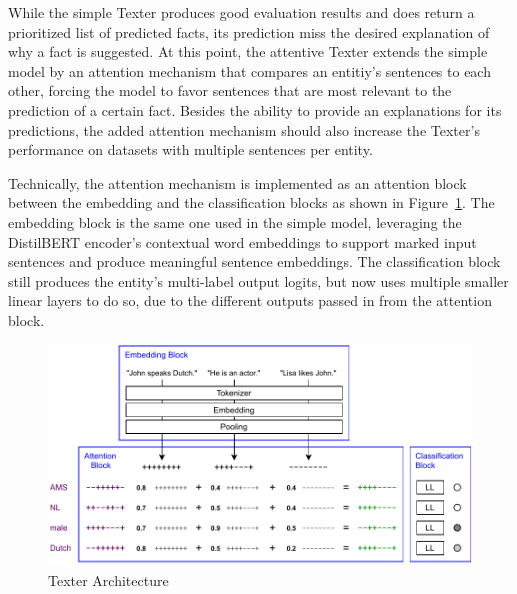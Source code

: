 While the simple Texter produces good evaluation results and does return a prioritized list of predicted facts, its prediction miss the desired explanation of why a fact is suggested. At this point, the attentive Texter extends the simple model by an attention mechanism that compares an entitiy's sentences to each other, forcing the model to favor sentences that are most relevant to the prediction of a certain fact. Besides the ability to provide an explanations for its predictions, the added attention mechanism should also increase the Texter's performance on datasets with multiple sentences per entity.

Technically, the attention mechanism is implemented as an attention block between the embedding and the classification blocks as shown in Figure~\ref{fig:4_approach/1_texter/2_attention_model/attention_architecture}. The embedding block is the same one used in the simple model, leveraging the DistilBERT encoder's contextual word embeddings to support marked input sentences and produce meaningful sentence embeddings. The classification block still produces the entity's multi-label output logits, but now uses multiple smaller linear layers to do so, due to the different outputs passed in from the attention block.

\begin{figure}[t]
    \centering
    \includegraphics{4_approach/1_texter/2_attention_model/attention_architecture}
    \caption{Texter Architecture}
    \label{fig:4_approach/1_texter/2_attention_model/attention_architecture}
\end{figure}

